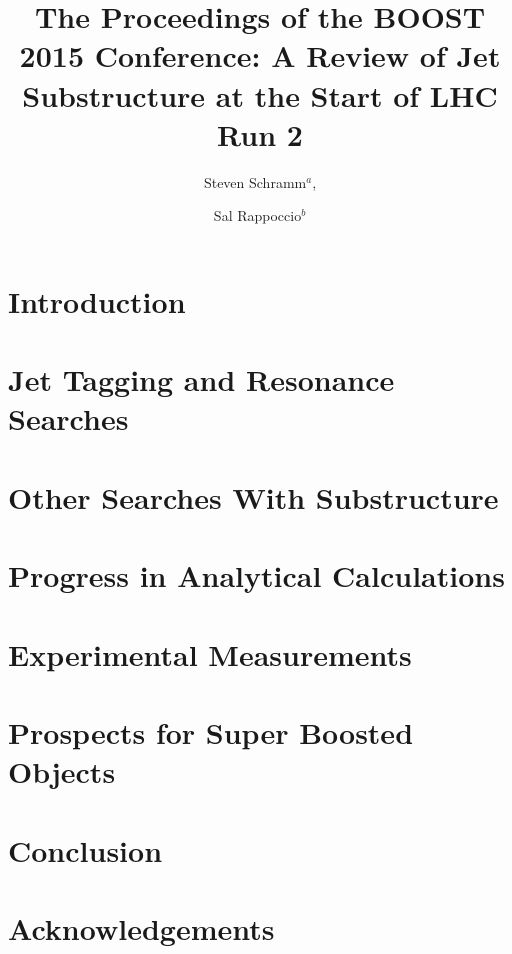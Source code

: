 \documentclass[a4paper,11pt]{article}
\title{\boldmath The Proceedings of the BOOST 2015 Conference: A Review of Jet Substructure at the Start of LHC Run 2}
\author{Steven Schramm$^{a}$,}
\author{Sal Rappoccio$^{b}$}
\affiliation{$^a$Universite de Geneve}
\affiliation{$^b$SUNY Buffalo}
\begin{document}
 
\maketitle
\flushbottom

\section{Introduction} 


\section{Jet Tagging and Resonance Searches}



\section{Other Searches With Substructure}



\section{Progress in Analytical Calculations}


\section{Experimental Measurements}


\section{Prospects for Super Boosted Objects}


\section{Conclusion}



\section{Acknowledgements}
\end{document}
